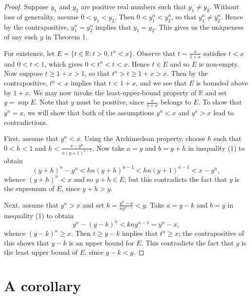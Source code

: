 \documentclass[12pt]{article}
\newcommand{\newp}{\vspace{5mm}}
\theoremstyle{definition}
\begin{document}
\begin{proof}

Suppose \( y_1 \) and \( y_2 \) are positive real numbers such that \( y_1 \neq y_2 \). Without loss of generality, assume \( 0 < y_1 < y_2 \). Then \( 0 < y_1^n < y_2^n \), so that \( y_1^n \neq y_2^n \). Hence by the contrapositive, \( y_1^n = y_2^n \) implies that \( y_1 = y_2 \). This gives us the uniqueness of any such \( y \) in Theorem 1.

\newp

For existence, let \( E = \{ t \in \mathbb{R} : t > 0, t^n < x \} \). Observe that \( t = \frac{x}{1 + x} \) satisfies \( t < x \) and \( 0 < t < 1 \), which gives \( 0 < t^n < t < x \). Hence \( t \in E \) and so \( E \) is non-empty. Now suppose \( t \geq 1 + x > 1 \), so that \( t^n > t \geq 1 + x > x \). Then by the contrapositive, \( t^n < x \) implies that \( t < 1 + x \), and we see that \( E \) is bounded above by \( 1 + x \). We may now invoke the least-upper-bound property of \( \mathbb{R} \) and set \( y = \sup E \). Note that \( y \) must be positive, since \( \frac{x}{1 + x} \) belongs to \( E \). To show that \( y^n = x \), we will show that both of the assumptions \( y^n < x \) and \( y^n > x \) lead to contradictions.

\newp

First, assume that \( y^n < x \). Using the Archimedean property, choose \( h \) such that \( 0 < h < 1 \) and \( h < \frac{x - y^n}{n (y+1)^{n-1}} \). Now take \( a = y \) and \( b = y + h \) in inequality (1) to obtain
\[
(y + h)^n - y^n < h n (y + h)^{n-1} < h n (y + 1)^{n-1} < x - y^n,
\]
whence \( (y + h)^n < x \) and so \( y + h \in E \); but this contradicts the fact that \( y \) is the supremum of \( E \), since \( y + h > y \).

\newp

Next, assume that \( y^n > x \) and set \( k = \frac{y^n - x}{ny^{n-1}} < y \). Take \( a = y - k \) and \( b = y \) in inequality (1) to obtain
\[
y^n - (y - k)^n < kny^{n-1} = y^n - x,
\]
whence \( (y - k)^n \geq x \). Then \( t \geq y - k \) implies that \( t^n \geq x \); the contrapositive of this shows that \( y - k \) is an upper bound for \( E \). This contradicts the fact that \( y \) is the least upper bound of \( E \), since \( y - k < y \).
\end{proof}

\section{A corollary}
\end{document}
